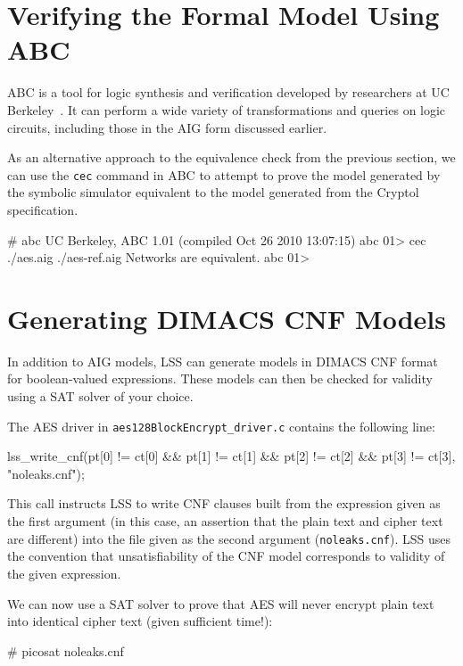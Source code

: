 \documentclass[11pt]{article}
\begin{document}
\section{Verifying the Formal Model Using ABC}

ABC is a tool for logic synthesis and verification developed by
researchers at UC Berkeley~\cite{abc}. It can perform a wide variety
of transformations and queries on logic circuits, including those in
the AIG form discussed earlier.

As an alternative approach to the equivalence check from the previous
section, we can use the \texttt{cec} command in ABC to attempt to
prove the model generated by the symbolic simulator equivalent to the
model generated from the Cryptol specification.

\begin{code}
# abc
UC Berkeley, ABC 1.01 (compiled Oct 26 2010 13:07:15)
abc 01> cec ./aes.aig ./aes-ref.aig
Networks are equivalent.
abc 01> 
\end{code}

\section{Generating DIMACS CNF Models}

In addition to AIG models, LSS can generate models in DIMACS CNF format
for boolean-valued expressions. These models can then be checked for
validity using a SAT solver of your choice.

The AES driver in \texttt{aes128BlockEncrypt\_driver.c} contains the
following line:
\begin{code}
lss_write_cnf(pt[0] != ct[0] &&
              pt[1] != ct[1] &&
              pt[2] != ct[2] &&
              pt[3] != ct[3], "noleaks.cnf");
\end{code}

This call instructs LSS to write CNF clauses built from the expression
given as the first argument (in this case, an assertion that the plain
text and cipher text are different) into the file given as the second
argument (\texttt{noleaks.cnf}). LSS uses the convention that
unsatisfiability of the CNF model corresponds to validity of the given
expression.

We can now use a SAT solver to prove that AES will never encrypt
plain text into identical cipher text (given sufficient time!):
\begin{code}
# picosat noleaks.cnf
\end{code}
\end{document}
